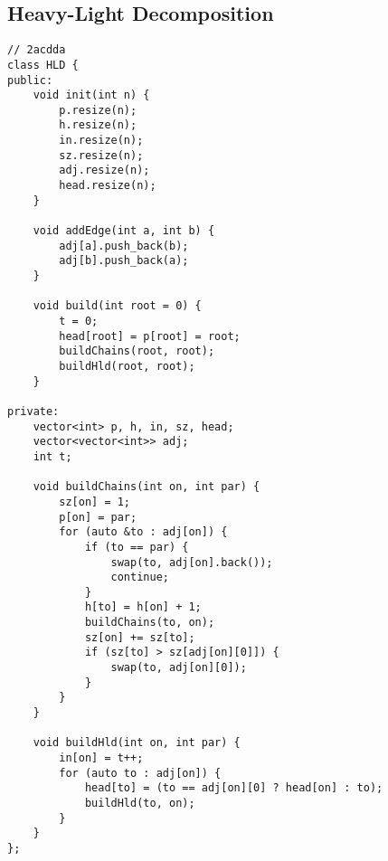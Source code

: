 \documentclass[12pt, a4paper, twoside]{article}
\begin{document}
\subsection{Heavy-Light Decomposition
}
\begin{lstlisting}
// 2acdda
class HLD {
public:
	void init(int n) {
		p.resize(n);
		h.resize(n);
		in.resize(n);
		sz.resize(n);
		adj.resize(n);
		head.resize(n);
	}

	void addEdge(int a, int b) {
		adj[a].push_back(b);
		adj[b].push_back(a);
	}

	void build(int root = 0) {
		t = 0;
		head[root] = p[root] = root;
		buildChains(root, root);
		buildHld(root, root);
	}

private:
	vector<int> p, h, in, sz, head;
	vector<vector<int>> adj;
	int t;

	void buildChains(int on, int par) {
		sz[on] = 1;
		p[on] = par;
		for (auto &to : adj[on]) {
			if (to == par) {
				swap(to, adj[on].back());
				continue;
			}
			h[to] = h[on] + 1;
			buildChains(to, on);
			sz[on] += sz[to];
			if (sz[to] > sz[adj[on][0]]) {
				swap(to, adj[on][0]);
			}
		}
	}

	void buildHld(int on, int par) {
		in[on] = t++;
		for (auto to : adj[on]) {
			head[to] = (to == adj[on][0] ? head[on] : to);
			buildHld(to, on);
		}
	}
};
\end{lstlisting}
\end{document}

